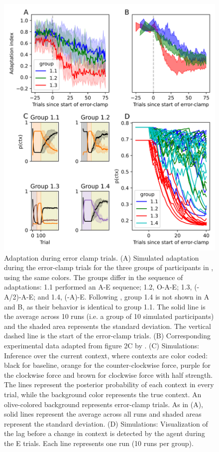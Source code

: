 \documentclass[a4paper,doc,floatsintext,natbib]{apa6}
\begin{document}
\begin{figure}
\centering
\includegraphics[width=\textwidth]{./figures/figure_5.png}
\caption{Adaptation during error clamp trials. (A) Simulated adaptation during the error-clamp trials for the three groups of participants in \cite{Vaswani_Decay_2013}, using the same colors. The groups differ in the sequence of adaptations: 1.1 performed an A-E sequence; 1.2, O-A-E; 1.3, (-A/2)-A-E; and 1.4, (-A)-E. Following \cite{Vaswani_Decay_2013}, group 1.4 is not shown in A and B, as their behavior is identical to group 1.1. The solid line is the average across 10 runs (i.e. a group of 10 simulated participants) and the shaded area represents the standard deviation. The vertical dashed line is the start of the error-clamp trials. (B) Corresponding experimental data adapted from figure 2C by \cite{Vaswani_Decay_2013}. (C) Simulations: Inference over the current context, where contexts are color coded: black for baseline, orange for the counter-clockwise force, purple for the clockwise force and brown for clockwise force with half strength. The lines represent the posterior probability of each context in every trial, while the background color represents the true context. An olive-colored background represents error-clamp trials. As in (A), solid lines represent the average across all runs and shaded areas represent the standard deviation. (D) Simulations: Visualization of the lag before a change in context is detected by the agent during the E trials. Each line represents one run (10 runs per group).}
\label{fig:vaswani-2013}
\end{figure}
\end{document}
